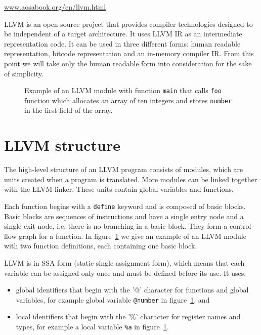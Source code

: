 \url{www.aosabook.org/en/llvm.html}
\medskip

LLVM is an open source project that provides compiler technologies designed to
be independent of a target architecture. It uses LLVM IR as an intermediate
representation code. It can be used in three different forms: human readable
representation, bitcode representation and an in-memory compiler IR. From this
point we will take only the human readable form into consideration for the sake
of simplicity.

\begin{figure}[h]
 
 \caption{Example of an LLVM module with function \texttt{main} that calls
 \texttt{foo} function which allocates an array of ten integers and stores
 \texttt{number} in the first field of the array.}
 \label{fig:llvm_example}
\end{figure}

\section{LLVM structure} %

The high-level structure of an LLVM program consists of modules, which are
units created when a program is translated. More modules can be linked together
with the LLVM linker. These units contain global variables and functions.

Each function begins with a \texttt{define} keyword and is composed of basic
blocks. Basic blocks are sequences of instructions and have a single entry node
and a single exit node, i.e. there is no branching in a basic block. They form
a control flow graph for a function. In figure~\ref{fig:llvm_example} we give
an example of an LLVM module with two function definitions, each containing one
basic block.

LLVM is in SSA form (static single assignment form), which means that each
variable can be assigned only once and must be defined before its use. It uses:

\begin{itemize}
    \item global identifiers that begin with the '@' character for functions
    and global variables, for example global variable \texttt{@number} in
    figure~\ref{fig:llvm_example}, and
    \item local identifiers that begin with the '\%' character for register
    names and types, for example a local variable \texttt{\%a} in
    figure~\ref{fig:llvm_example}.
\end{itemize}

